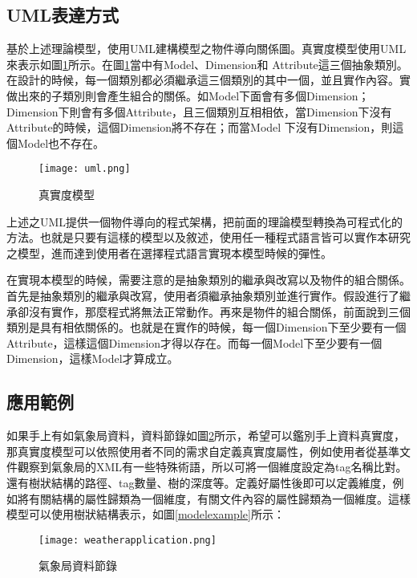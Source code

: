 \subsection{UML表達方式}
基於上述理論模型，使用UML建構模型之物件導向關係圖。真實度模型使用UML來表示如圖\ref{uml}所示。在圖\ref{uml}當中有Model、Dimension和 Attribute這三個抽象類別。在設計的時候，每一個類別都必須繼承這三個類別的其中一個，並且實作內容。實做出來的子類別則會產生組合的關係。如Model下面會有多個Dimension；Dimension下則會有多個Attribute，且三個類別互相相依，當Dimension下沒有Attribute的時候，這個Dimension將不存在；而當Model 下沒有Dimension，則這個Model也不存在。

\begin{figure}[H]
\centering
\graphicspath{{/Users/FUDA/Documents/masterThesis/image/}}
\texttt{[image: uml.png]}
\caption{真實度模型}
\label{uml}
\end{figure}

上述之UML提供一個物件導向的程式架構，把前面的理論模型轉換為可程式化的方法。也就是只要有這樣的模型以及敘述，使用任一種程式語言皆可以實作本研究之模型，進而達到使用者在選擇程式語言實現本模型時候的彈性。\\\par

在實現本模型的時候，需要注意的是抽象類別的繼承與改寫以及物件的組合關係。首先是抽象類別的繼承與改寫，使用者須繼承抽象類別並進行實作。假設進行了繼承卻沒有實作，那麼程式將無法正常動作。再來是物件的組合關係，前面說到三個類別是具有相依關係的。也就是在實作的時候，每一個Dimension下至少要有一個Attribute，這樣這個Dimension才得以存在。而每一個Model下至少要有一個Dimension，這樣Model才算成立。

\subsection{應用範例}
如果手上有如氣象局資料，資料節錄如圖\ref{applicationexample}所示，希望可以鑑別手上資料真實度，那真實度模型可以依照使用者不同的需求自定義真實度屬性，例如使用者從基準文件觀察到氣象局的XML有一些特殊術語，所以可將一個維度設定為tag名稱比對。還有樹狀結構的路徑、tag數量、樹的深度等。定義好屬性後即可以定義維度，例如將有關結構的屬性歸類為一個維度，有關文件內容的屬性歸類為一個維度。這樣模型可以使用樹狀結構表示，如圖\ref{modelexample}所示：
\begin{figure}[H]
\centering
\graphicspath{{/Users/FUDA/Documents/masterThesis/image/}}
\texttt{[image: weatherapplication.png]}
\caption{氣象局資料節錄}
\label{applicationexample}
\end{figure}

